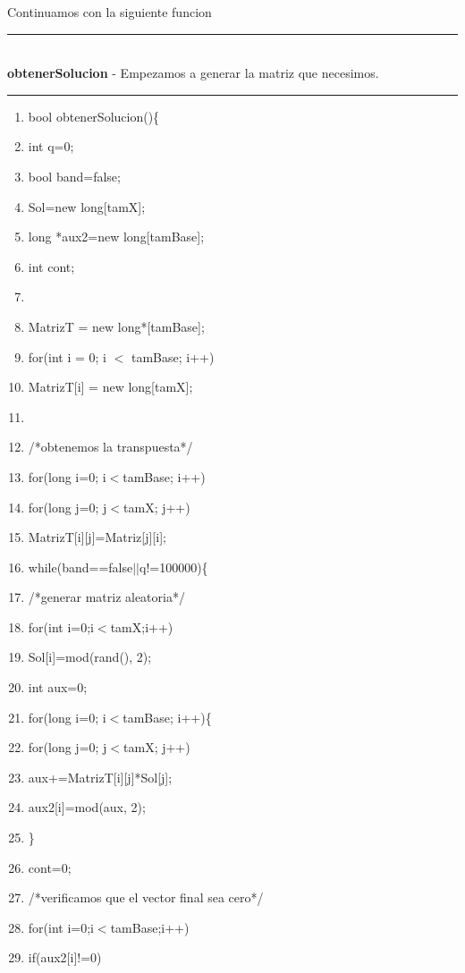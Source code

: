 \documentclass[11pt, conference]{IEEEtran}
\begin{document}
Continuamos con la siguiente funcion\\
\rule[0mm]{181mm}{0.1mm}\\
\textbf{obtenerSolucion} - Empezamos a generar la matriz que necesimos.\\
\rule[3mm]{181mm}{0.1mm}
\begin{enumerate}
	\item bool obtenerSolucion()\{
	\item \qquad int q=0;
	\item \qquad bool band=false;
	\item \qquad Sol=new long[tamX];
	\item \qquad long *aux2=new long[tamBase];
	\item \qquad int cont;
	\item 	
	\item \qquad MatrizT = new long*[tamBase];
	\item \qquad for(int i = 0; i $<$ tamBase; i++)
	\item \qquad MatrizT[i] = new long[tamX];
	\item 	
	\item \qquad /*obtenemos la transpuesta*/
	\item \qquad for(long i=0; i$<$tamBase; i++)
	\item \qquad for(long j=0; j$<$tamX; j++)
	\item \qquad MatrizT[i][j]=Matriz[j][i];
	\item \qquad while(band==false$\lvert\lvert$q!=100000)\{
	\item \qquad\qquad /*generar matriz aleatoria*/
	\item \qquad\qquad for(int i=0;i$<$tamX;i++)
	\item \qquad\qquad\qquad Sol[i]=mod(rand(), 2);
	\item \qquad\qquad int aux=0;
	\item \qquad\qquad for(long i=0; i$<$tamBase; i++)\{
	\item \qquad\qquad\qquad for(long j=0; j$<$tamX; j++)
	\item \qquad\qquad\qquad\qquad aux+=MatrizT[i][j]*Sol[j];
	\item \qquad\qquad\qquad aux2[i]=mod(aux, 2);
	\item \qquad\qquad \}
	\item \qquad\qquad cont=0;
	\item \qquad\qquad /*verificamos que el vector final sea cero*/
	\item \qquad\qquad for(int i=0;i$<$tamBase;i++)
	\item \qquad\qquad\qquad if(aux2[i]!=0)

\end{enumerate}
\end{document}
